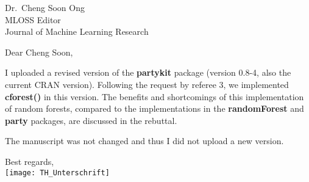 \documentclass[ngerman,uzh]{scrlttr2}
\begin{document}

\begin{letter}{
Dr.~Cheng Soon Ong \\
MLOSS Editor \\
Journal of Machine Learning Research}

\subject{JMLR-14-133-4 revision}

\opening{Dear Cheng Soon,}

I uploaded a revised version of the \textbf{partykit} package (version
0.8-4, also the current CRAN version). Following the request by referee 3,
we implemented \textbf{cforest()} in this version. The benefits and
shortcomings of this implementation of random forests, compared to the
implementations in the \textbf{randomForest} and \textbf{party} packages, are
discussed in the rebuttal.

The manuscript was not changed and thus I did not upload a new version.

Best regards, \\
\texttt{[image: TH\_Unterschrift]}

\end{letter}
\end{document}
